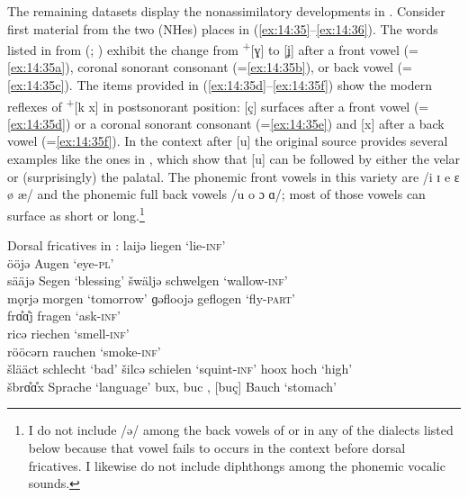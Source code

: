 The remaining datasets display the nonassimilatory developments in . Consider first material from the two (NHes) places in (\ref{ex:14:35}--\ref{ex:14:36}). The words listed in  from  (\citealt{Schoof1913a, Schoof1913b, Schoof1913c}; ) exhibit the change from  \textsuperscript{+}[ɣ] to [ʝ] after a front vowel (=\ref{ex:14:35a}), coronal sonorant consonant (=\ref{ex:14:35b}), or back vowel (=\ref{ex:14:35c}). The items provided in (\ref{ex:14:35d}--\ref{ex:14:35f}) show the modern reflexes of  \textsuperscript{+}[k x] in postsonorant position: [ç] surfaces after a front vowel (=\ref{ex:14:35d}) or a coronal sonorant consonant (=\ref{ex:14:35e}) and [x] after a back vowel (=\ref{ex:14:35f}). In the context after [u] the original source \citep[209]{Schoof1913c} provides several examples like the ones in , which show that [u] can be followed by either the velar or (surprisingly) the palatal. The phonemic front vowels in this variety are /i ɪ e ɛ ø æ/ and the phonemic full back vowels /u o ɔ ɑ/; most of those vowels can surface as short or long.\footnote{{I do not include /ə/ among the back vowels of  or in any of the dialects listed below because that vowel fails to occurs in the context before dorsal fricatives. I likewise do not include diphthongs among the phonemic vocalic sounds.}}

\ea%
\label{ex:14:35}Dorsal fricatives in :
\ea\label{ex:14:35a} laijə \tab [lɑiʝə] \tab liegen \tab ‘lie\textsc{{}-inf}’ \\
    ööjə \tab [øːʝə] \tab Augen \tab ‘eye-\textsc{pl}’ \\
    sääjə \tab [sæːʝə] \tab Segen \tab ‘blessing’ 
\ex\label{ex:14:35b} šwäljə \tab [ʃvælʝə] \tab schwelgen \tab ‘wallow\textsc{{}-inf}’ \\
    mǫrjə \tab [mɔrʝə] \tab morgen \tab ‘tomorrow’ 
\ex\label{ex:14:35c} ɡəfloojə \tab [gəfloːʝə] \tab geflogen \tab ‘fly\textsc{{}-part}’ \\
    frɑ̊ɑ̊j \tab [frɑːʝ] \tab fragen \tab ‘ask\textsc{{}-inf}’ \\
\ex\label{ex:14:35d} ricə \tab [riçə] \tab riechen \tab ‘smell\textsc{{}-inf}’ \\
    rööcərn \tab [røːçərn] \tab rauchen \tab ‘smoke\textsc{{}-inf}’ \\
    šlääct \tab [ʃlæːçt] \tab schlecht \tab ‘bad’ 
\ex\label{ex:14:35e} šilcə \tab [ʃilçə] \tab schielen \tab ‘squint\textsc{{}-inf}’ 
\ex\label{ex:14:35f} hoox \tab [hoːx] \tab hoch \tab ‘high’ \\
    šbrɑ̊ɑ̊x \tab [ʃprɑːx] \tab Sprache \tab ‘language’ 
\ex\label{ex:14:35g} bux, buc \tab [bux], [buç] \tab Bauch \tab ‘stomach’ 
\z 
\z 

